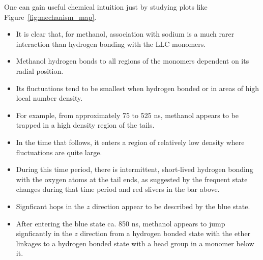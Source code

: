 \documentclass{article}
\begin{document}
  \noindent One can gain useful chemical intuition just by studying plots like
  Figure~\ref{fig:mechanism_map}.
  \begin{itemize}
    \item It is clear that, for methanol, association with sodium is a much rarer
    interaction than hydrogen bonding with the LLC monomers.
    \item Methanol hydrogen bonds to all regions of the monomers dependent on
    its radial position.
    \item Its fluctuations tend to be smallest when hydrogen bonded or in areas
    of high local number density. 
    \item For example, from approximately 75 to 525 ns, methanol appears to be trapped
    in a high density region of the tails.
    \item In the time that follows, it enters a region of relatively low density
    where fluctuations are quite large. 
    \item During this time period, there is intermittent, short-lived hydrogen 
    bonding with the oxygen atoms at the tail ends, as suggested by the frequent 
    state changes during that time period and red slivers in the bar above.
    \item Signficant hops in the $z$ direction appear to be described by the blue
    state.
    \item After entering the blue state ca. 850 ns, methanol appears to jump
    signficantly in the $z$ direction from a hydrogen bonded state with the ether 
    linkages to a hydrogen bonded state with a head group in a monomer below it.
  \end{itemize}

  
\end{document}
